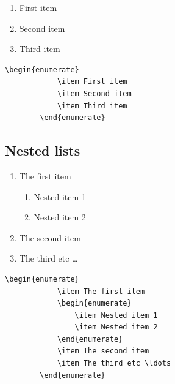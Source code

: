 \begin{enumerate}
	\item First item
	\item Second item
	\item Third item
\end{enumerate}

\begin{mdframed}
	\begin{lstlisting}[language = Tex, caption={Example of an enumerated structure}, label={lst:TestListings}]
		\begin{enumerate}
			\item First item
			\item Second item
			\item Third item
		\end{enumerate}
	\end{lstlisting}
\end{mdframed}

\subsection{Nested lists}

\begin{enumerate}
	\item The first item
	\begin{enumerate}
		\item Nested item 1
		\item Nested item 2
	\end{enumerate}
	\item The second item
	\item The third etc \ldots
\end{enumerate}

\begin{mdframed}
	\begin{lstlisting}[language = Tex, caption={Example of a nested list structure}]
		\begin{enumerate}
			\item The first item
			\begin{enumerate}
				\item Nested item 1
				\item Nested item 2
			\end{enumerate}
			\item The second item
			\item The third etc \ldots
		\end{enumerate}
	\end{lstlisting}
\end{mdframed}

